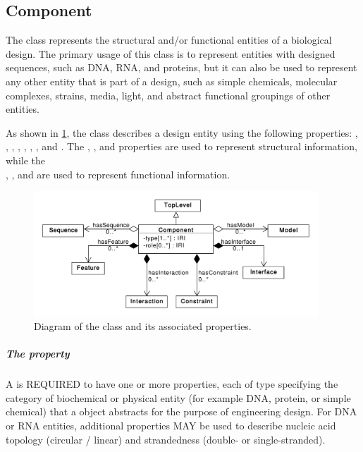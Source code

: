 \subsection{Component}
\label{sec:Component}

The  class represents the structural and/or functional entities of a biological design. The primary usage of this class is to represent entities with designed sequences, such as DNA, RNA, and proteins, but it can also be used to represent any other entity that is part of a design, such as simple chemicals, molecular complexes, strains, media, light, and abstract functional groupings of other entities.

As shown in \ref{uml:component}, the  class describes a design entity using the following properties: , , , , , , , and .  
The , , and  properties are used to represent structural information, while the\\ , , and  are used to represent functional information.

\begin{figure}[ht]
\begin{center}
\includegraphics[width=0.95\textwidth]{uml/component}
\caption[]{Diagram of the  class and its associated properties.}
\label{uml:component}
\end{center}
\end{figure} 

\subparagraph{The  property}
\label{sec:type:C}

A  is REQUIRED to have one or more  properties, each of type  specifying the category of biochemical or physical entity (for example DNA, protein, or simple chemical) that a  object abstracts
for the purpose of engineering design. For DNA or RNA entities, additional  properties MAY be used to describe nucleic acid topology (circular / linear) and strandedness (double- or single-stranded).

